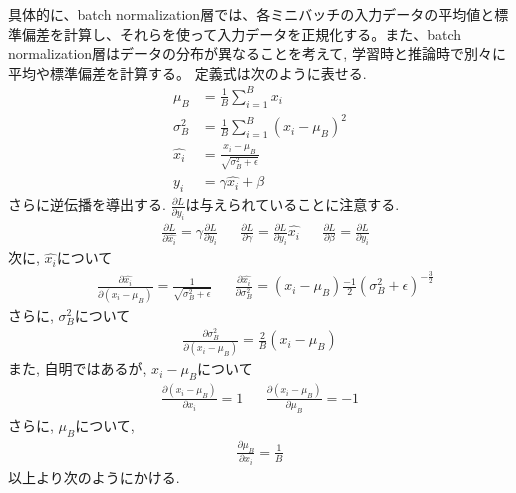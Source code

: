 \documentclass[a4paper,11pt]{jsarticle}
\begin{document}
具体的に、batch normalization層では、各ミニバッチの入力データの平均値と標準偏差を計算し、それらを使って入力データを正規化する。また、batch normalization層はデータの分布が異なることを考えて, 学習時と推論時で別々に平均や標準偏差を計算する。
定義式は次のように表せる.
\begin{align*}
  \mu_B      & = \frac{1}{B}\sum_{i=1}^{B} x_i                    \\
  \sigma_B^2 & = \frac{1}{B}\sum_{i=1}^{B} (x_i - \mu_B)^2        \\
  \hat{x_i}  & = \frac{x_i - \mu_B}{\sqrt{\sigma_B^2 + \epsilon}} \\
  y_i        & = \gamma\hat{x_i} + \beta
\end{align*}
さらに逆伝播を導出する. $\frac{\partial L}{\partial y_i}$は与えられていることに注意する.
\begin{align*}
   & \frac{\partial L}{\partial \hat{x_i}} = \gamma\frac{\partial L}{\partial y_i} &
   & \frac{\partial L}{\partial \gamma} = \frac{\partial L}{\partial y_i}\hat{x_i} &
   & \frac{\partial L}{\partial \beta} = \frac{\partial L}{\partial y_i}
\end{align*}
次に, $\hat{x_i}$について
\begin{align*}
   & \frac{\partial \hat{x_i}}{\partial (x_i -\mu_B)} = \frac{1}{\sqrt{\sigma_B^2 + \epsilon}}                        &
   & \frac{\partial \hat{x_i}}{\partial \sigma_B^2} = (x_i - \mu_B)\frac{-1}{2}(\sigma_B^2 + \epsilon)^{-\frac{3}{2}}
\end{align*}
さらに, $\sigma_B^2$について
\begin{align*}
  \frac{\partial \sigma_B^2}{\partial (x_i - \mu_B)} = \frac{2}{B} (x_i - \mu_B)
\end{align*}
また, 自明ではあるが, $x_i - \mu_B$について
\begin{align*}
  \frac{\partial (x_i - \mu_B)}{\partial x_i} = 1 &  &
  \frac{\partial (x_i - \mu_B)}{\partial \mu_B} = -1
\end{align*}
さらに, $\mu_B$について,
\begin{align*}
  \frac{\partial \mu_B}{\partial x_i} = \frac{1}{B}
\end{align*}
以上より次のようにかける.
\end{document}
